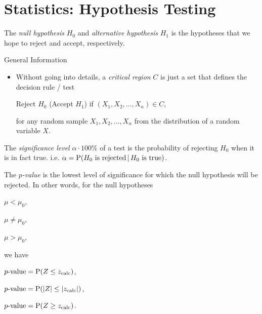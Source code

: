 \documentclass[../Notes.tex]{subfiles}
\begin{document}
\chapter{Statistics: Hypothesis Testing}
\begin{definition}{}{}
  The \emph{null hypothesis} \(H_0\) and \emph{alternative hypothesis} \(H_1\) is the hypotheses that we hope to reject and accept, respectively. 
\end{definition}
\begin{stbox}{General Information}
  \begin{itemize}
    \item Without going into details, a \emph{critical region} \(C\) is just a set that defines the decision rule / test 
    \begin{center}
      Reject \(H_0\) (Accept \(H_1\)) \quad if \((X_1,X_2,\dots,X_n)\in C\),
    \end{center}
    for any random sample \(X_1,X_2,\dots,X_n\) from the distribution of a random variable \(X\).
  \end{itemize}
\end{stbox}
\begin{definition}{}{}
  The \emph{significance level} \(\alpha\cdot100\%\) of a test is the probability of rejecting \(H_0\) when it is in fact true. i.e. \(\alpha=\operatorname{P}(H_0\text{ is rejected}\,\vert\,H_0\text{ is true})\).
\end{definition}
\begin{definition}{}{}
  The \emph{\(p\)-value} is the lowest level of significance for which the null hypothesis will be rejected. In other words, for the null hypotheses
    \begin{center}
      \begin{enumerate*}[label=(\alph*),itemjoin={\quad}]
        \item \(\mu<\mu_0\),
        \item \(\mu \neq \mu_0\),
        \item \(\mu>\mu_0\),
      \end{enumerate*}
    \end{center}
    we have
    \begin{center}
      \begin{enumerate*}[label=(\alph*),itemjoin={\quad}]
        \item \(p\text{-value}=\operatorname{P}(Z\leq z_\text{calc})\),
        \item \(p\text{-value}=\operatorname{P}(\lvert Z \rvert\leq \lvert z_\text{calc} \rvert)\),
        \item \(p\text{-value}=\operatorname{P}(Z\geq z_\text{calc})\).
      \end{enumerate*}
    \end{center}
\end{definition}
\end{document}
